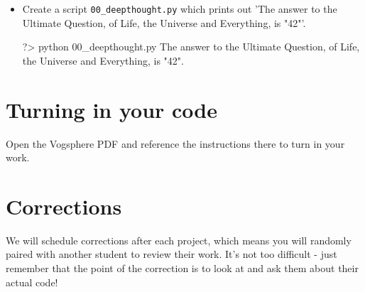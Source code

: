 \documentclass{42-en}
\begin{document}
\begin{itemize}

\item Create a script \texttt{00\_deepthought.py} which prints out 'The answer to the Ultimate Question, of Life, the Universe and Everything, is "42"'.

\begin{42console}
	?> python 00_deepthought.py
	The answer to the Ultimate Question, of Life, the Universe and Everything, is "42".
\end{42console}

\end{itemize}


\chapter{Turning in your code}

Open the Vogsphere PDF and reference the instructions there to turn in your work.


\chapter{Corrections}

We will schedule corrections after each project, which means you will randomly paired with another student to review their work. It's not too difficult - just remember that the point of the correction is to look at and ask them about their actual code!

\end{document}
